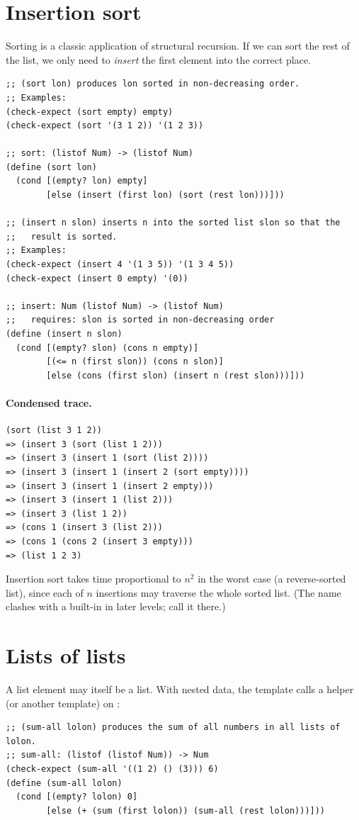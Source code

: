 \section{Insertion sort}

Sorting is a classic application of structural recursion. If we can sort the
rest of the list, we only need to \emph{insert} the first element into the
correct place.

\begin{lstlisting}[style=racket]
;; (sort lon) produces lon sorted in non-decreasing order.
;; Examples:
(check-expect (sort empty) empty)
(check-expect (sort '(3 1 2)) '(1 2 3))

;; sort: (listof Num) -> (listof Num)
(define (sort lon)
  (cond [(empty? lon) empty]
        [else (insert (first lon) (sort (rest lon)))]))

;; (insert n slon) inserts n into the sorted list slon so that the
;;   result is sorted.
;; Examples:
(check-expect (insert 4 '(1 3 5)) '(1 3 4 5))
(check-expect (insert 0 empty) '(0))

;; insert: Num (listof Num) -> (listof Num)
;;   requires: slon is sorted in non-decreasing order
(define (insert n slon)
  (cond [(empty? slon) (cons n empty)]
        [(<= n (first slon)) (cons n slon)]
        [else (cons (first slon) (insert n (rest slon)))]))
\end{lstlisting}

\paragraph{Condensed trace.}
\begin{lstlisting}[style=racket]
(sort (list 3 1 2))
=> (insert 3 (sort (list 1 2)))
=> (insert 3 (insert 1 (sort (list 2))))
=> (insert 3 (insert 1 (insert 2 (sort empty))))
=> (insert 3 (insert 1 (insert 2 empty)))
=> (insert 3 (insert 1 (list 2)))
=> (insert 3 (list 1 2))
=> (cons 1 (insert 3 (list 2)))
=> (cons 1 (cons 2 (insert 3 empty)))
=> (list 1 2 3)
\end{lstlisting}

Insertion sort takes time proportional to $n^2$ in the worst case (a
reverse-sorted list), since each of $n$ insertions may traverse the whole
sorted list. (The name  clashes with a built-in in later levels;
call it  there.)

\section{Lists of lists}
A list element may itself be a list. With nested data, the template calls a
helper (or another template) on :
\begin{lstlisting}[style=racket]
;; (sum-all lolon) produces the sum of all numbers in all lists of lolon.
;; sum-all: (listof (listof Num)) -> Num
(check-expect (sum-all '((1 2) () (3))) 6)
(define (sum-all lolon)
  (cond [(empty? lolon) 0]
        [else (+ (sum (first lolon)) (sum-all (rest lolon)))]))
\end{lstlisting}

